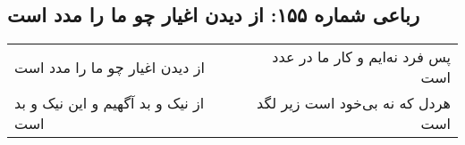 \begin{center}
\section*{رباعی شماره ۱۵۵: از دیدن اغیار چو ما را مدد است}
\label{sec:0155}
\begin{longtable}{l p{0.5cm} r}
از دیدن اغیار چو ما را مدد است
&&
پس فرد نه‌ایم و کار ما در عدد است
\\
از نیک و بد آگهیم و این نیک و بد است
&&
هردل که نه بی‌خود است زیر لگد است
\\
\end{longtable}
\end{center}
